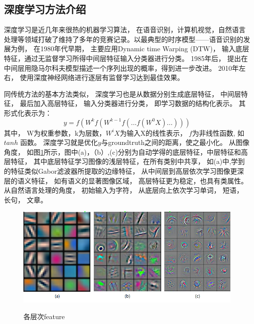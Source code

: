 \subsection{深度学习方法介绍}

深度学习是近几年来很热的机器学习算法， 在语音识别，计算机视觉，自然语言处理等领域打破了维持了多年的竞赛记录。以最典型的时序模型——语音识别的发展为例， 在1980年代早期， 主要应用Dynamic time Warping (DTW)\cite{juang1984hidden,myers1981comparative,rabiner1978considerations,berndt1994using}， 输入底层特征，通过无监督学习所得中间层特征输入分类器进行分类。 1985年后， \cite{huang1990hidden,rabiner1989tutorial,rabiner1986introduction}提出在中间层用隐马尔科夫模型描述一个序列出现的概率，得到进一步改进。 2010年左右， 使用深度神经网络进行逐层有监督学习达到最佳效果\cite{waibel1989modular,nakamura1989speaker}。


同传统方法的基本方法类似， 深度学习也是从数据分别生成底层特征， 中间层特征， 最后加入高层特征， 输入分类器进行分类， 即学习数据的结构化表示。 其形式化表示为：
\begin{equation}
y=f(W^kf(W^{k-1}f(...f(W^0X)...)))
\label{Eq:dl_formulation}
\end{equation}
其中， W为权重参数，k为层数，$W^iX$为输入X的线性表示， $f$为非线性函数, 如$tanh$ 函数。 深度学习就是优化$y$与groundtruth之间的距离，使之最小化。 从图像角度， 如图\ref{fig:feature_level}所示\cite{zeiler2014visualizing,zeiler2013stochastic}，图中(a)，（b）,(c)分别为自动学得的底层特征，中层特征和高层特征， 其中底层特征学习图像的浅层特征，在所有类别中共享， 如(a)中,学到的特征类似Gabor滤波器所提取的边缘特征\cite{ngiam2010tiled,shi1998gabor}， 从中间层到高层依次学习图像更深层的语义特征， 如有语义的显著图像区域， 高层特征更为稳定，也具有类属性。  从自然语言处理的角度， 初始输入为字符， 从底层向上依次学习单词， 短语， 长句， 文章。

\begin{figure}[htb]
  \centering
  \includegraphics[scale=0.9]{Pictures/CNN/low_mid_high_feature.png}\\
  \caption{各层次feature}\label{fig:feature_level}
\end{figure}


